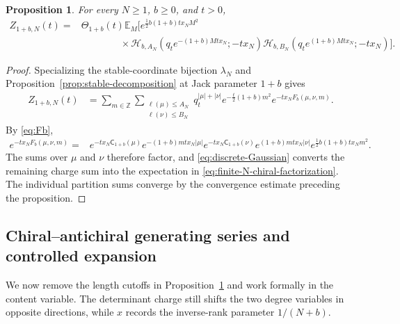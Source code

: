 \documentclass[11pt,a4paper,reqno]{article}
\newtheorem{proposition}[theorem]{Proposition}
\theoremstyle{definition}
\theoremstyle{remark}
\newcommand\Z{{\mathbb Z}}
\newcommand\E{{\mathbb E}}
\newcommand\cA{{\mathsf C}}
\newcommand\ellpart{{\ell}}
\begin{document}
\begin{proposition}\label{prop:finite-N-chiral-factorization}
For every $N\geq1$, $b\geq0$, and $t>0$,
\begin{equation}\label{eq:finite-N-chiral-factorization}
\begin{aligned}
Z_{1+b,N}(t)={}&\Theta_{1+b}(t)\E_M\Big[e^{\frac12 b(1+b)t x_NM^2}\\
&\qquad\qquad\times\mathscr H_{b,A_N}\left(q_t e^{-(1+b)Mt x_N};-t x_N\right)\mathscr H_{b,B_N}\left(q_t e^{(1+b)Mt x_N};-t x_N\right)\Big].
\end{aligned}
\end{equation}
\end{proposition}

\begin{proof}
Specializing the stable-coordinate bijection $\lambda_N$ and Proposition~\ref{prop:stable-decomposition} at Jack parameter $1+b$ gives
\begin{align*}
Z_{1+b,N}(t)&=\sum_{m\in\Z}\sum_{\substack{\ellpart(\mu)\leq A_N\\ \ellpart(\nu)\leq B_N}}q_t^{|\mu|+|\nu|}e^{-\frac t2(1+b)m^2}e^{-t x_NF_b(\mu,\nu,m)}.
\end{align*}
By \eqref{eq:Fb},
\begin{align*}
e^{-t x_NF_b(\mu,\nu,m)}={}&e^{-t x_N\cA_{1+b}(\mu)}e^{-(1+b)mt x_N|\mu|}e^{-t x_N\cA_{1+b}(\nu)}e^{(1+b)mt x_N|\nu|}e^{\frac12b(1+b)t x_Nm^2}.
\end{align*}
The sums over $\mu$ and $\nu$ therefore factor, and \eqref{eq:discrete-Gaussian} converts the remaining charge sum into the expectation in \eqref{eq:finite-N-chiral-factorization}.  The individual partition sums converge by the convergence estimate preceding the proposition.
\end{proof}


\subsection{Chiral--antichiral generating series and controlled expansion}\label{subsec:controlled-expansion}
We now remove the length cutoffs in Proposition~\ref{prop:finite-N-chiral-factorization} and work formally in the content variable.  The determinant charge still shifts the two degree variables in opposite directions, while $x$ records the inverse-rank parameter $1/(N+b)$.
\end{document}
